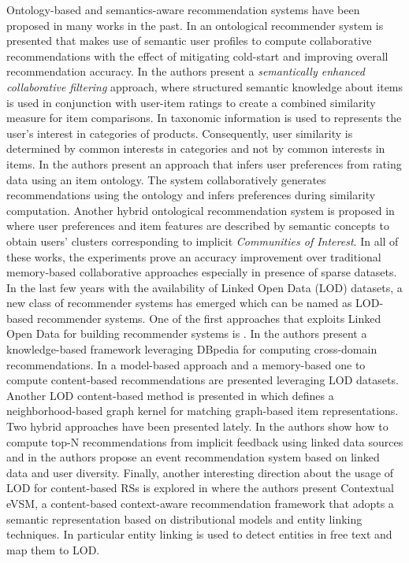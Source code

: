 Ontology-based and semantics-aware recommendation systems have been proposed in many works in the past. 
In \citep{Middleton_2009} an ontological recommender system is presented that makes use of semantic user profiles to compute collaborative recommendations with the effect of mitigating cold-start and improving overall recommendation accuracy. 
In \citep{mobasher2004} the authors present a \textit{semantically enhanced collaborative filtering} approach, where structured semantic knowledge about items is used in conjunction with user-item ratings to create a combined similarity measure for item comparisons. 
In \citep{Ziegler2004} taxonomic information is used to represents the user's interest in categories of products. Consequently, user similarity is determined by common interests in categories and not by common interests in items. 
In \citep{Anand2007} the authors present an approach that infers user preferences from rating data using an item ontology. The system collaboratively generates recommendations using the ontology and infers preferences during similarity computation. 
Another hybrid ontological recommendation system is proposed in \citep{Cantador08amultilayer} where user preferences and item features are described by semantic concepts to obtain users' clusters corresponding to implicit \textit{Communities of Interest}.
In all of these works, the experiments prove an accuracy improvement over traditional memory-based collaborative approaches especially in presence of sparse datasets. 
In the last few years with the availability of Linked Open Data (LOD) datasets, a new class of recommender systems has emerged which can be named as LOD-based recommender systems. 
One of the first approaches that exploits Linked Open Data for building recommender systems is \citep{HeitmannH10}. 
In \citep{Fernandez-Tobias2011} the authors present a knowledge-based framework leveraging DBpedia for computing cross-domain recommendations. 
In \citep{DMOR12,DMORZ12} a model-based approach and a memory-based one to compute content-based recommendations are presented leveraging LOD datasets. Another LOD content-based method is presented in \citep{ODMD14a} which defines a neighborhood-based graph kernel for matching graph-based item representations. 
Two hybrid approaches have been presented lately. In \citep{Ostuni2013} the authors show how to compute top-N recommendations from implicit feedback using linked data sources and in \citep{Khrouf2013} the authors propose an event recommendation system based on linked data and user diversity. 
Finally, another interesting direction about the usage of LOD for content-based RSs is explored in \citep{MustoSLG14} where the authors present Contextual eVSM, a content-based context-aware recommendation framework that adopts a semantic representation based on distributional models and entity linking techniques. In particular entity linking is used to detect entities in free text and map them to LOD.


